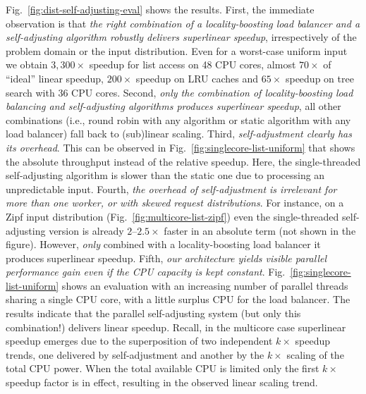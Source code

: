 Fig.~\ref{fig:dist-self-adjusting-eval} shows the results. First, the immediate observation is that \emph{the right combination of a locality-boosting load balancer and a self-adjusting algorithm robustly delivers superlinear speedup}, irrespectively of the problem domain or the input distribution. Even for a worst-case uniform input we obtain $3,300\times$ speedup for list access on 48 CPU cores, almost $70\times$ of ``ideal'' linear speedup, $200\times$ speedup on LRU caches and $65\times$ speedup on tree search with 36 CPU cores. Second, \emph{only the combination of locality-boosting load balancing and self-adjusting algorithms produces superlinear speedup}, all other combinations (i.e., round robin with any algorithm or static algorithm with any load balancer) fall back to (sub)linear scaling.  Third, \emph{self-adjustment clearly has its overhead}. This can be observed in Fig.~\ref{fig:singlecore-list-uniform} that shows the absolute throughput instead of the relative speedup. Here, the single-threaded self-adjusting algorithm is slower than the static one due to processing an unpredictable input. Fourth, \emph{the overhead of self-adjustment is irrelevant for more than one worker, or with skewed request distributions}. For instance, on a Zipf input distribution (Fig.~\ref{fig:multicore-list-zipf}) even the single-threaded self-adjusting version is already $2$--$2.5\times$ faster in an absolute term (not shown in the figure). However, \emph{only} combined with a locality-boosting load balancer it produces superlinear speedup. Fifth, \emph{our architecture yields visible parallel performance gain even if the CPU capacity is kept constant}. Fig.~\ref{fig:singlecore-list-uniform} shows an evaluation with an increasing number of parallel threads sharing a single CPU core, with a little surplus CPU for the load balancer.  The results indicate that the parallel self-adjusting system (but only this combination!) delivers linear speedup.  Recall, in the multicore case superlinear speedup emerges due to the superposition of two independent $k\times$ speedup trends, one delivered by self-adjustment and another by the $k\times$ scaling of the total CPU power. When the total available CPU is limited only the first $k\times$ speedup factor is in effect, resulting in the observed linear scaling trend.


%

